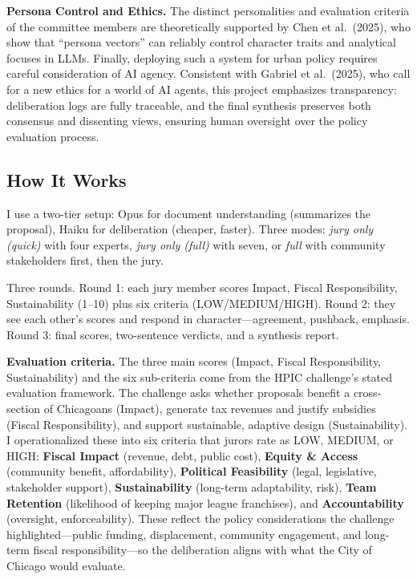 \documentclass[
  11pt,
]{article}
\begin{document}
\textbf{Persona Control and Ethics.} The distinct personalities and
evaluation criteria of the committee members are theoretically supported
by Chen et al.~(2025), who show that ``persona vectors'' can reliably
control character traits and analytical focuses in LLMs. Finally,
deploying such a system for urban policy requires careful consideration
of AI agency. Consistent with Gabriel et al.~(2025), who call for a new
ethics for a world of AI agents, this project emphasizes transparency:
deliberation logs are fully traceable, and the final synthesis preserves
both consensus and dissenting views, ensuring human oversight over the
policy evaluation process.

\subsection{How It Works}\label{how-it-works}

I use a two-tier setup: Opus for document understanding (summarizes the
proposal), Haiku for deliberation (cheaper, faster). Three modes:
\emph{jury only (quick)} with four experts, \emph{jury only (full)} with
seven, or \emph{full} with community stakeholders first, then the jury.

Three rounds. Round 1: each jury member scores Impact, Fiscal
Responsibility, Sustainability (1--10) plus six criteria
(LOW/MEDIUM/HIGH). Round 2: they see each other's scores and respond in
character---agreement, pushback, emphasis. Round 3: final scores,
two-sentence verdicts, and a synthesis report.

\textbf{Evaluation criteria.} The three main scores (Impact, Fiscal
Responsibility, Sustainability) and the six sub-criteria come from the
HPIC challenge's stated evaluation framework. The challenge asks whether
proposals benefit a cross-section of Chicagoans (Impact), generate tax
revenues and justify subsidies (Fiscal Responsibility), and support
sustainable, adaptive design (Sustainability). I operationalized these
into six criteria that jurors rate as LOW, MEDIUM, or HIGH:
\textbf{Fiscal Impact} (revenue, debt, public cost), \textbf{Equity \&
Access} (community benefit, affordability), \textbf{Political
Feasibility} (legal, legislative, stakeholder support),
\textbf{Sustainability} (long-term adaptability, risk), \textbf{Team
Retention} (likelihood of keeping major league franchises), and
\textbf{Accountability} (oversight, enforceability). These reflect the
policy considerations the challenge highlighted---public funding,
displacement, community engagement, and long-term fiscal
responsibility---so the deliberation aligns with what the City of
Chicago would evaluate.
\end{document}
